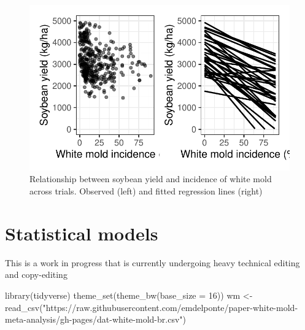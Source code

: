 \documentclass[
  letterpaper,
  DIV=11,
  numbers=noendperiod]{scrreprt}
\newenvironment{Shaded}{\begin{snugshade}}{\end{snugshade}}
\newcommand{\AttributeTok}[1]{\textcolor[rgb]{0.40,0.45,0.13}{#1}}
\newcommand{\DecValTok}[1]{\textcolor[rgb]{0.68,0.00,0.00}{#1}}
\newcommand{\FunctionTok}[1]{\textcolor[rgb]{0.28,0.35,0.67}{#1}}
\newcommand{\NormalTok}[1]{\textcolor[rgb]{0.00,0.23,0.31}{#1}}
\newcommand{\OtherTok}[1]{\textcolor[rgb]{0.00,0.23,0.31}{#1}}
\newcommand{\StringTok}[1]{\textcolor[rgb]{0.13,0.47,0.30}{#1}}
\begin{document}
\begin{figure}[H]

{\centering \includegraphics{yieldloss-concepts_files/figure-pdf/fig-damagecurve2-1.pdf}

}

\caption{\label{fig-damagecurve2}Relationship between soybean yield and
incidence of white mold across trials. Observed (left) and fitted
regression lines (right)}

\end{figure}

\hypertarget{statistical-models}{%
\chapter{Statistical models}\label{statistical-models}}

\begin{tcolorbox}[enhanced jigsaw, breakable, left=2mm, opacityback=0, rightrule=.15mm, toprule=.15mm, colframe=quarto-callout-note-color-frame, arc=.35mm, colback=white, bottomrule=.15mm, leftrule=.75mm]
\begin{minipage}[t]{5.5mm}
\textcolor{quarto-callout-note-color}{\faInfo}
\end{minipage}%
\begin{minipage}[t]{\textwidth - 5.5mm}

This is a work in progress that is currently undergoing heavy technical
editing and copy-editing

\end{minipage}%
\end{tcolorbox}

\begin{Shaded}
\begin{Highlighting}[]
\FunctionTok{library}\NormalTok{(tidyverse)}
\FunctionTok{theme\_set}\NormalTok{(}\FunctionTok{theme\_bw}\NormalTok{(}\AttributeTok{base\_size =} \DecValTok{16}\NormalTok{))}
\NormalTok{wm }\OtherTok{\textless{}{-}} \FunctionTok{read\_csv}\NormalTok{(}\StringTok{"https://raw.githubusercontent.com/emdelponte/paper{-}white{-}mold{-}meta{-}analysis/gh{-}pages/dat{-}white{-}mold{-}br.csv"}\NormalTok{)}
\end{Highlighting}
\end{Shaded}
\end{document}
